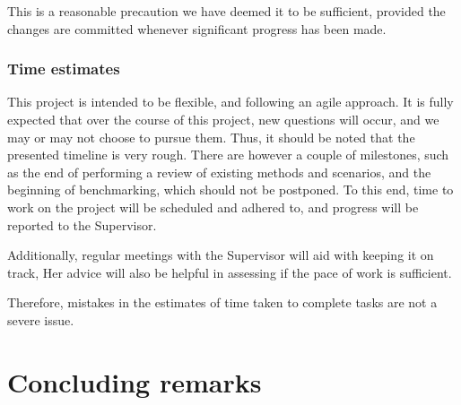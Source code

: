 \documentclass[11pt,journal]{IEEEtran}
\begin{document}
	This is a reasonable precaution we have deemed it to be sufficient, provided the changes are committed whenever significant progress has been made.
	
	\subsubsection{Time estimates}
	This project is intended to be flexible, and following an agile approach. It is fully expected that over the course of this project, new questions will occur, and we may or may not choose to pursue them. Thus, it should be noted that the presented timeline is very rough. There are however a couple of milestones, such as the end of performing a review of existing methods and scenarios, and the beginning of benchmarking, which should not be postponed. To this end, time to work on the project will be scheduled and adhered to, and progress will be reported to the Supervisor.
	
	Additionally, regular meetings with the Supervisor will aid with keeping it on track, Her advice will also be helpful in assessing if the pace of work is sufficient.
	
	Therefore, mistakes in the estimates of time taken to complete tasks are not a severe issue.
	
	\section{Concluding remarks}
	
	\IEEEPARstart{}{} 
	
\end{document}
